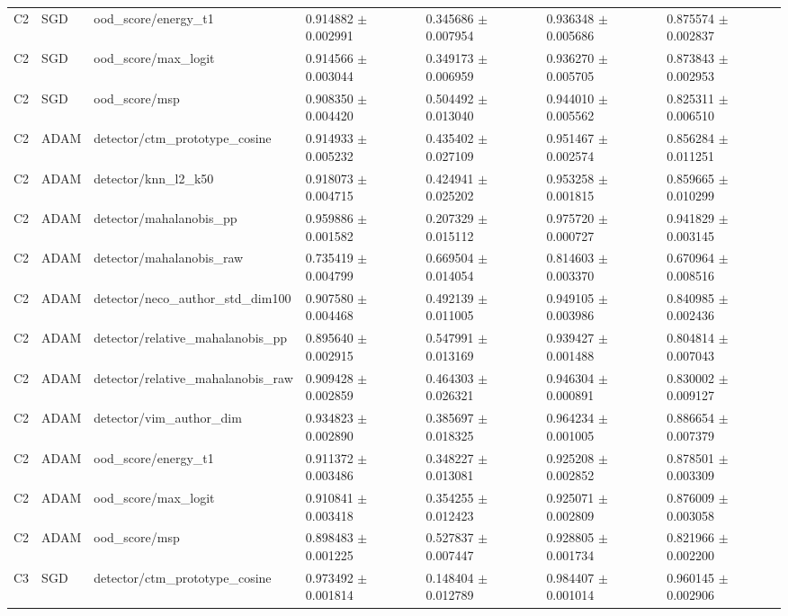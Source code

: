 \begin{longtable}{lllllll}
C2 & SGD & ood\_score/energy\_t1 & 0.914882 $\pm$ 0.002991 & 0.345686 $\pm$ 0.007954 & 0.936348 $\pm$ 0.005686 & 0.875574 $\pm$ 0.002837 \\
C2 & SGD & ood\_score/max\_logit & 0.914566 $\pm$ 0.003044 & 0.349173 $\pm$ 0.006959 & 0.936270 $\pm$ 0.005705 & 0.873843 $\pm$ 0.002953 \\
C2 & SGD & ood\_score/msp & 0.908350 $\pm$ 0.004420 & 0.504492 $\pm$ 0.013040 & 0.944010 $\pm$ 0.005562 & 0.825311 $\pm$ 0.006510 \\
C2 & ADAM & detector/ctm\_prototype\_cosine & 0.914933 $\pm$ 0.005232 & 0.435402 $\pm$ 0.027109 & 0.951467 $\pm$ 0.002574 & 0.856284 $\pm$ 0.011251 \\
C2 & ADAM & detector/knn\_l2\_k50 & 0.918073 $\pm$ 0.004715 & 0.424941 $\pm$ 0.025202 & 0.953258 $\pm$ 0.001815 & 0.859665 $\pm$ 0.010299 \\
C2 & ADAM & detector/mahalanobis\_pp & 0.959886 $\pm$ 0.001582 & 0.207329 $\pm$ 0.015112 & 0.975720 $\pm$ 0.000727 & 0.941829 $\pm$ 0.003145 \\
C2 & ADAM & detector/mahalanobis\_raw & 0.735419 $\pm$ 0.004799 & 0.669504 $\pm$ 0.014054 & 0.814603 $\pm$ 0.003370 & 0.670964 $\pm$ 0.008516 \\
C2 & ADAM & detector/neco\_author\_std\_dim100 & 0.907580 $\pm$ 0.004468 & 0.492139 $\pm$ 0.011005 & 0.949105 $\pm$ 0.003986 & 0.840985 $\pm$ 0.002436 \\
C2 & ADAM & detector/relative\_mahalanobis\_pp & 0.895640 $\pm$ 0.002915 & 0.547991 $\pm$ 0.013169 & 0.939427 $\pm$ 0.001488 & 0.804814 $\pm$ 0.007043 \\
C2 & ADAM & detector/relative\_mahalanobis\_raw & 0.909428 $\pm$ 0.002859 & 0.464303 $\pm$ 0.026321 & 0.946304 $\pm$ 0.000891 & 0.830002 $\pm$ 0.009127 \\
C2 & ADAM & detector/vim\_author\_dim & 0.934823 $\pm$ 0.002890 & 0.385697 $\pm$ 0.018325 & 0.964234 $\pm$ 0.001005 & 0.886654 $\pm$ 0.007379 \\
C2 & ADAM & ood\_score/energy\_t1 & 0.911372 $\pm$ 0.003486 & 0.348227 $\pm$ 0.013081 & 0.925208 $\pm$ 0.002852 & 0.878501 $\pm$ 0.003309 \\
C2 & ADAM & ood\_score/max\_logit & 0.910841 $\pm$ 0.003418 & 0.354255 $\pm$ 0.012423 & 0.925071 $\pm$ 0.002809 & 0.876009 $\pm$ 0.003058 \\
C2 & ADAM & ood\_score/msp & 0.898483 $\pm$ 0.001225 & 0.527837 $\pm$ 0.007447 & 0.928805 $\pm$ 0.001734 & 0.821966 $\pm$ 0.002200 \\
C3 & SGD & detector/ctm\_prototype\_cosine & 0.973492 $\pm$ 0.001814 & 0.148404 $\pm$ 0.012789 & 0.984407 $\pm$ 0.001014 & 0.960145 $\pm$ 0.002906 \\

\end{longtable}
